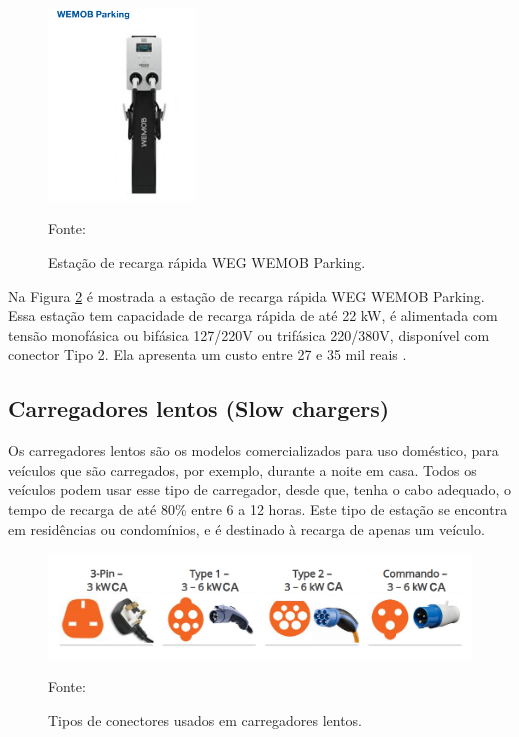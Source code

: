 \begin{figure}[H]
    \centering
    \includegraphics[width=0.35\textwidth]{./Figuras/estacao_rapida.png}
    \caption{Estação de recarga rápida WEG WEMOB Parking.}{Fonte: \cite{weg_estacao}}
   \label{fig:estacao_rapida}
\end{figure}

Na Figura \ref{fig:slow_chargers} é mostrada a estação de recarga rápida WEG WEMOB Parking. Essa estação tem capacidade de recarga rápida de até 22 kW, é alimentada com tensão monofásica ou bifásica 127/220V ou trifásica 220/380V, disponível com conector Tipo 2. Ela apresenta um custo entre 27 e 35 mil reais \cite{weg_estacao}.

\subsection{Carregadores lentos (Slow chargers)}

Os carregadores lentos são os modelos comercializados para uso doméstico, para veículos que são carregados, por exemplo, durante a noite em casa. Todos os veículos podem usar esse tipo de carregador, desde que, tenha o cabo adequado, o tempo de recarga de até 80\% entre 6 a 12 horas. Este tipo de estação se encontra em residências ou condomínios, e é destinado à recarga de apenas um veículo.

\begin{figure}[H]
    \centering
    \includegraphics[width=1\textwidth]{./Figuras/slow_chargers.png}
    \caption{Tipos de conectores usados em carregadores lentos.}{Fonte: \cite{ev_conect_zap}}
   \label{fig:slow_chargers}
\end{figure}

